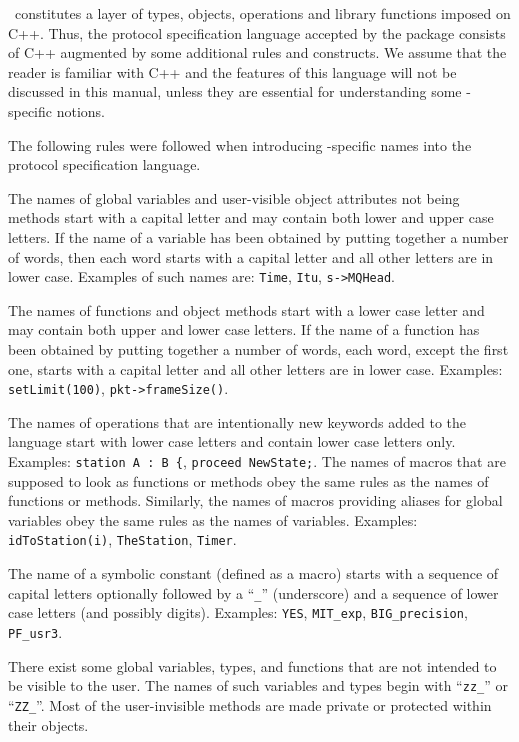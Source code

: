 \smurph\ constitutes a layer of types, objects,
operations and library functions imposed on C++.
Thus, the protocol specification language accepted by the package consists
of C++ augmented by some additional rules and constructs.
We assume that the reader is familiar with C++ and the features of this
language will not be
discussed in this manual, unless they are essential for understanding
some \smurph-specific notions.

The following rules were followed when
introducing \smurph-specific names into the protocol specification language.

The names of global variables and user-visible object attributes
not being methods
start with a capital letter and may contain both lower and upper case
letters.
If the name of a variable has been obtained by putting together a number of
words, then each word starts with a capital letter and all other letters are
in lower case.
Examples of such names are: {\tt Time}, {\tt Itu}, {\tt s->MQHead}.

The names of functions and object methods start with a lower case letter
and may contain both upper and lower case letters.
If the name of a function has been obtained by putting together a number of
words, each word, except the first one, starts with a capital letter and all
other letters are in lower case.
Examples: {\tt setLimit(100)}, {\tt pkt->frameSize()}.

The names of operations
that are intentionally new keywords added to the
language start with lower case letters and contain lower case letters only.
Examples: {\tt station~A~:~B~\{}, {\tt proceed~NewState;}.
The names of macros that are supposed to look as functions or methods
obey the same rules as the names of functions or methods.
Similarly, the names of macros providing aliases for global variables obey
the same rules as the names of variables.
Examples: {\tt idToStation(i)}, {\tt TheStation}, {\tt Timer}.

The name of a symbolic constant (defined as a macro) starts with a sequence of
capital letters optionally followed by a ``{\tt \_}'' (underscore) and a
sequence of lower case letters (and possibly digits).
Examples: {\tt YES}, {\tt MIT\_exp}, {\tt BIG\_precision}, {\tt PF\_usr3}.

There exist some global variables, types, and functions
that are not intended to be visible to the user.
The names of such variables and types begin with ``{\tt zz\_}'' or ``{\tt ZZ\_}''.
Most of the user-invisible methods are made private or protected
within their objects.

